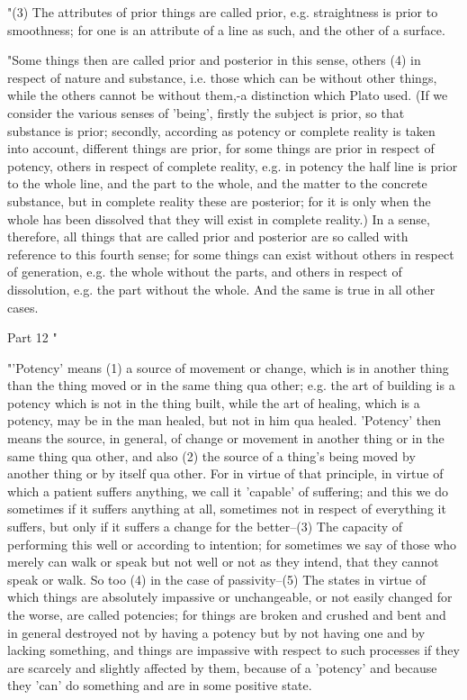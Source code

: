 "(3) The attributes of prior things are called prior, e.g. straightness
is prior to smoothness; for one is an attribute of a line as such,
and the other of a surface. 

"Some things then are called prior and posterior in this sense, others
(4) in respect of nature and substance, i.e. those which can be without
other things, while the others cannot be without them,-a distinction
which Plato used. (If we consider the various senses of 'being', firstly
the subject is prior, so that substance is prior; secondly, according
as potency or complete reality is taken into account, different things
are prior, for some things are prior in respect of potency, others
in respect of complete reality, e.g. in potency the half line is prior
to the whole line, and the part to the whole, and the matter to the
concrete substance, but in complete reality these are posterior; for
it is only when the whole has been dissolved that they will exist
in complete reality.) In a sense, therefore, all things that are called
prior and posterior are so called with reference to this fourth sense;
for some things can exist without others in respect of generation,
e.g. the whole without the parts, and others in respect of dissolution,
e.g. the part without the whole. And the same is true in all other
cases. 

Part 12 "

"'Potency' means (1) a source of movement or change, which is in another
thing than the thing moved or in the same thing qua other; e.g. the
art of building is a potency which is not in the thing built, while
the art of healing, which is a potency, may be in the man healed,
but not in him qua healed. 'Potency' then means the source, in general,
of change or movement in another thing or in the same thing qua other,
and also (2) the source of a thing's being moved by another thing
or by itself qua other. For in virtue of that principle, in virtue
of which a patient suffers anything, we call it 'capable' of suffering;
and this we do sometimes if it suffers anything at all, sometimes
not in respect of everything it suffers, but only if it suffers a
change for the better--(3) The capacity of performing this well or
according to intention; for sometimes we say of those who merely can
walk or speak but not well or not as they intend, that they cannot
speak or walk. So too (4) in the case of passivity--(5) The states
in virtue of which things are absolutely impassive or unchangeable,
or not easily changed for the worse, are called potencies; for things
are broken and crushed and bent and in general destroyed not by having
a potency but by not having one and by lacking something, and things
are impassive with respect to such processes if they are scarcely
and slightly affected by them, because of a 'potency' and because
they 'can' do something and are in some positive state. 

